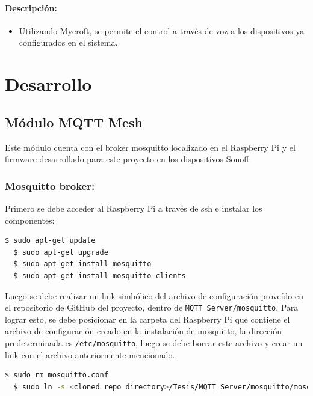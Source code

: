 \paragraph{Descripción:}

\begin{itemize}
\item Utilizando Mycroft, se permite el control a través de voz a los dispositivos ya configurados en el sistema.
\end{itemize}


\section{Desarrollo}

\subsection{Módulo MQTT Mesh}

Este módulo cuenta con el broker mosquitto localizado en el Raspberry Pi y el firmware desarrollado para este proyecto en los dispositivos Sonoff.

\subsubsection{Mosquitto broker:} \label{mosquitto-broker}
Primero se debe acceder al Raspberry Pi a través de ssh e instalar los componentes:

\begin{lstlisting}[language=bash]
  $ sudo apt-get update
  $ sudo apt-get upgrade
  $ sudo apt-get install mosquitto
  $ sudo apt-get install mosquitto-clients
\end{lstlisting}

Luego se debe realizar un link simbólico del archivo de configuración proveído en el repositorio de GitHub del proyecto, dentro de \lstinline[columns=fixed]{MQTT_Server/mosquitto}. Para lograr esto, se debe posicionar en la carpeta del Raspberry Pi que contiene el archivo de configuración creado en la instalación de mosquitto, la dirección predeterminada es \lstinline[columns=fixed]{/etc/mosquitto}, luego se debe borrar este archivo y crear un link con el archivo anteriormente mencionado.

\begin{lstlisting}[language=bash]
  $ sudo rm mosquitto.conf
  $ sudo ln -s <cloned repo directory>/Tesis/MQTT_Server/mosquitto/mosquitto.conf mosquitto.conf
\end{lstlisting}

